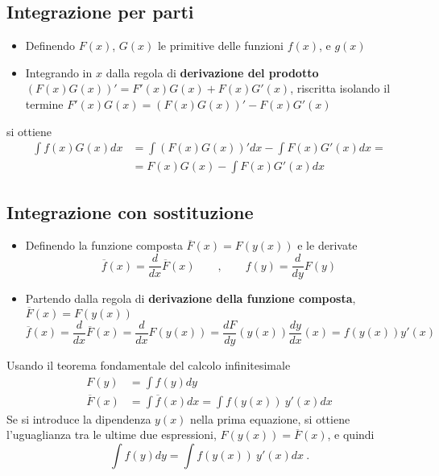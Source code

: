 \subsection{Integrazione per parti}
\begin{itemize}
 \item Definendo $F(x)$, $G(x)$ le primitive delle funzioni $f(x)$, e $g(x)$
 \item Integrando in $x$ dalla regola di \textbf{derivazione del prodotto} $(F(x)G(x))' = F'(x)G(x) + F(x)G'(x)$, riscritta isolando il termine $F'(x)G(x) = (F(x)G(x))' - F(x)G'(x)$
\end{itemize}
si ottiene
\begin{equation}
\begin{aligned}
    \int f(x) G(x) dx & = \int (F(x) G(x))' dx - \int F(x) G'(x) dx = \\
    &= F(x)G(x) - \int F(x) G'(x) dx 
\end{aligned}
\end{equation}

\begin{example}
\end{example}

\subsection{Integrazione con sostituzione}
\begin{itemize}
    \item Definendo la funzione composta $\overline{F}(x) = F(y(x))$ e le derivate
        \begin{equation}
            \overline{f}(x) = \dfrac{d}{dx} \overline{F}(x) \qquad , \qquad f(y) = \dfrac{d}{dy}F(y)
        \end{equation}
    \item Partendo dalla regola di \textbf{derivazione della funzione composta}, $\overline{F}(x) = F(y(x))$
        \begin{equation}
            \overline{f}(x) = \dfrac{d}{dx} \overline{F}(x) = \dfrac{d}{dx} F(y(x)) = \dfrac{d F}{dy}(y(x)) \dfrac{d y}{d x}(x) = f(y(x)) y'(x)
        \end{equation}
\end{itemize}
Usando il teorema fondamentale del calcolo infinitesimale
\begin{equation}
\begin{aligned}
    F(y) & = \int f(y) dy \\
    \overline{F}(x) & = \int \overline{f}(x) dx = \int f(y(x)) \ y'(x) dx
\end{aligned}
\end{equation}
Se si introduce la dipendenza $y(x)$ nella prima equazione, si ottiene l'uguaglianza tra le ultime due espressioni, $F(y(x)) = \overline{F}(x)$, e quindi
\begin{equation}
  \int f(y) dy = \int f(y(x)) \ y'(x) dx \ .
\end{equation}

\begin{example}
\end{example}
